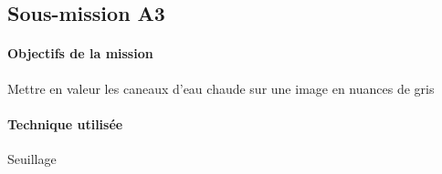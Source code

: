 \subsection{Sous-mission A3}

	\begin{vwcol}[widths={0.65,0.2}, rule=0pt]
	\begin{minipage}{0.7\textwidth}
	\paragraph{Objectifs de la mission}

	Mettre en valeur les caneaux d'eau chaude sur une image en nuances de gris
	\end{minipage}

	\begin{minipage}{0.25\textwidth}
	\begin{flushright}
	\paragraph{Technique utilisée}
	
	Seuillage\up{\ref{Seuillage}}
	\end{flushright}
	\end{minipage}

	\end{vwcol} 


